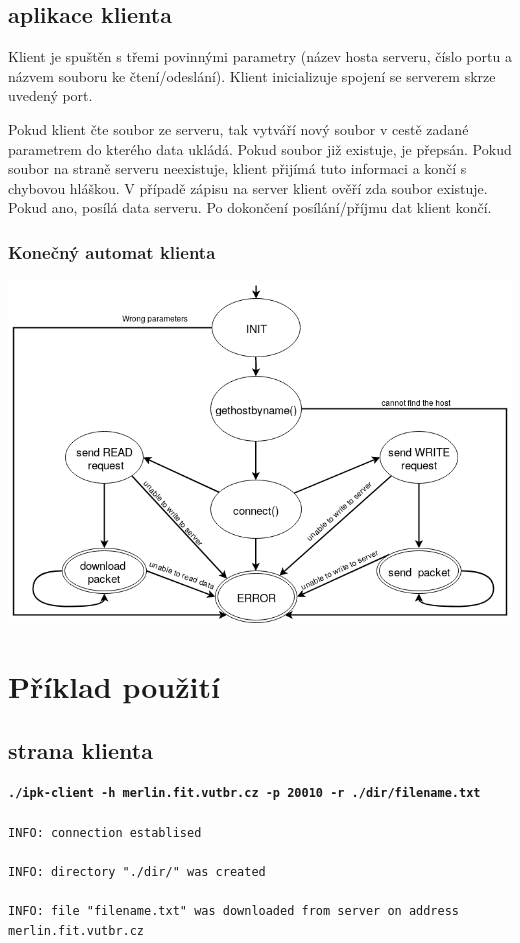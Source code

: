 \documentclass[a4paper, 12pt]{article}
\begin{document}
\subsection{aplikace klienta}
Klient je spuštěn s třemi povinnými parametry (název hosta serveru, číslo portu a názvem souboru ke čtení/odeslání). Klient inicializuje spojení se serverem skrze uvedený port. 

Pokud klient čte soubor ze serveru, tak vytváří nový soubor v cestě zadané parametrem do kterého data ukládá. Pokud soubor již existuje, je přepsán.  Pokud soubor na straně serveru neexistuje, klient přijímá tuto informaci a končí s chybovou hláškou. V případě zápisu na server klient ověří zda soubor existuje. Pokud ano, posílá data serveru. Po dokončení posílání/příjmu dat klient končí.

\subsubsection{Konečný automat klienta}
\includegraphics[scale = 0.5]{IPK_FSMKLIENT.png}


\section{Příklad použití}
\subsection*{strana klienta}
\textbf{\texttt{./ipk-client -h merlin.fit.vutbr.cz -p 20010 -r ./dir/filename.txt }}\\ \\
\texttt{INFO: connection establised}\\ \\
\texttt{INFO: directory "./dir/" was created}\\ \\
\texttt{INFO: file "filename.txt" was downloaded from server on address} \\  \texttt{merlin.fit.vutbr.cz}\\
\end{document}
